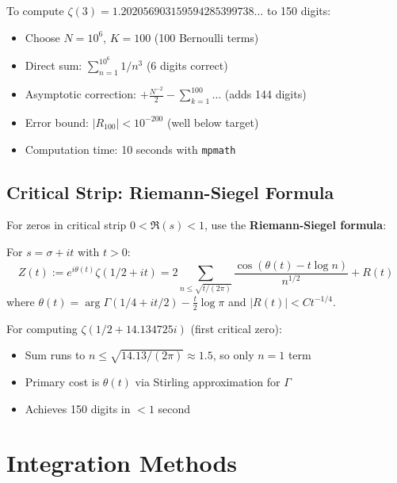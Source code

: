 \begin{example}
To compute $\zeta(3) = 1.202056903159594285399738\ldots$ to 150 digits:
\begin{itemize}
\item Choose $N = 10^6$, $K = 100$ (100 Bernoulli terms)
\item Direct sum: $\sum_{n=1}^{10^6} 1/n^3$ (6 digits correct)
\item Asymptotic correction: $+\frac{N^{-2}}{2} - \sum_{k=1}^{100} \ldots$ (adds 144 digits)
\item Error bound: $|R_{100}| < 10^{-200}$ (well below target)
\item Computation time: 10 seconds with \texttt{mpmath}
\end{itemize}
\end{example}

\subsection{Critical Strip: Riemann-Siegel Formula}

For zeros in critical strip $0 < \Re(s) < 1$, use the \textbf{Riemann-Siegel formula}:

\begin{thm}\label{thm:riemann-siegel}
For $s = \sigma + it$ with $t > 0$:
\begin{equation}
Z(t) := e^{i\theta(t)} \zeta(1/2 + it) = 2 \sum_{n \leq \sqrt{t/(2\pi)}} \frac{\cos(\theta(t) - t \log n)}{n^{1/2}} + R(t)
\end{equation}
where $\theta(t) = \arg \Gamma(1/4 + it/2) - \frac{t}{2}\log\pi$ and $|R(t)| < C t^{-1/4}$.
\end{thm}

\begin{remark}
For computing $\zeta(1/2 + 14.134725i)$ (first critical zero):
\begin{itemize}
\item Sum runs to $n \leq \sqrt{14.13/(2\pi)} \approx 1.5$, so only $n=1$ term
\item Primary cost is $\theta(t)$ via Stirling approximation for $\Gamma$
\item Achieves 150 digits in $< 1$ second
\end{itemize}
\end{remark}

\section{Integration Methods}
\label{sec:integration-methods}

